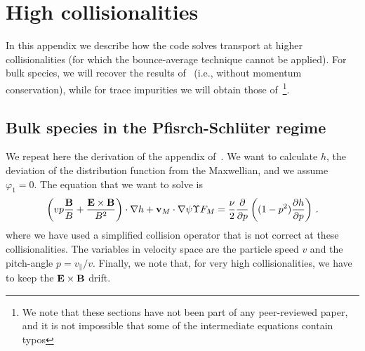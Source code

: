\chapter{High collisionalities}\label{CHAP_HIGHCOL}

In this appendix we describe how the code solves transport at higher collisionalities (for which the bounce-average technique cannot be applied). For bulk species, we will recover the results of \DKES~(i.e., without momentum conservation), while for trace impurities we will obtain those of~\citep{calvo2018nf}\footnote{We note that these sections have not been part of any peer-reviewed paper, and it is not impossible that some of the intermediate equations contain typos}.


\section{Bulk species in the Pfisrch-Schl\"uter regime}

We repeat here the derivation of the appendix of~\citep{igitkhanov2006impurity}.  We want to calculate $h$, the deviation of the distribution function from the Maxwellian, and we assume $\varphi_1=0$. The equation that we want to solve is
\begin{equation}
\left(vp\frac{\mathbf{B}}{B}+\frac{\mathbf{E}\times\mathbf{B}}{B^2}\right)\cdot\mathbf{\nabla} h + {\mathbf{v}}_M\cdot\mathbf{\nabla}\psi \Upsilon F_M = \frac{\nu}{2}\frac{\partial}{\partial p}\left((1-p^2)\frac{\partial h}{\partial p}\right)\,.\label{EQ_DKEPS}
\end{equation}
where we have used a simplified collision operator that is not correct at these collisionalities. The variables in velocity space are the particle speed $v$ and the pitch-angle $p=v_\parallel/v$. Finally, we note that, for very high collisionalities, we have to keep the $\mathbf{E}\times\mathbf{B}$ drift. 

